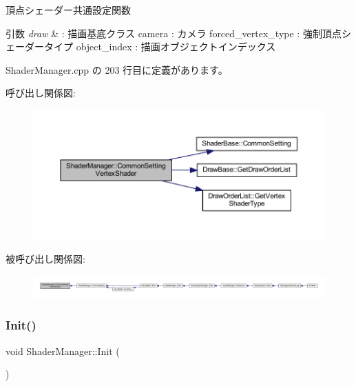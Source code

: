 頂点シェーダー共通設定関数 


\begin{DoxyParams}{引数}
{\em draw} & \+: 描画基底クラス camera \+: カメラ forced\+\_\+vertex\+\_\+type \+: 強制頂点シェーダータイプ object\+\_\+index \+: 描画オブジェクトインデックス \\
\hline
\end{DoxyParams}


 Shader\+Manager.\+cpp の 203 行目に定義があります。

呼び出し関係図\+:\nopagebreak
\begin{figure}[H]
\begin{center}
\leavevmode
\includegraphics[width=350pt]{class_shader_manager_a836c92ee48dfbf8b8c8085f9413027bd_cgraph}
\end{center}
\end{figure}
被呼び出し関係図\+:
\nopagebreak
\begin{figure}[H]
\begin{center}
\leavevmode
\includegraphics[width=350pt]{class_shader_manager_a836c92ee48dfbf8b8c8085f9413027bd_icgraph}
\end{center}
\end{figure}
\mbox{\label{class_shader_manager_a8e8fd62a28cc18addcd5ec6507a5dcb0}} 
\subsubsection{\texorpdfstring{Init()}{Init()}}
{\footnotesize\ttfamily void Shader\+Manager\+::\+Init (\begin{DoxyParamCaption}{ }\end{DoxyParamCaption})}



